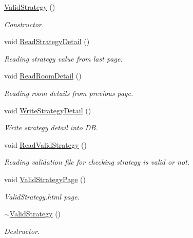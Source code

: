\begin{DoxyCompactItemize}
\item 
\hyperlink{classValidStrategy_ae168db88ebfa1eabdd7f241a631ffc27}{\-Valid\-Strategy} ()
\begin{DoxyCompactList}\small\item\em \-Constructor. \end{DoxyCompactList}\item 
void \hyperlink{classValidStrategy_ae8b17f98d81f8f70d974139086495dfa}{\-Read\-Strategy\-Detail} ()
\begin{DoxyCompactList}\small\item\em \-Reading strategy value from last page. \end{DoxyCompactList}\item 
void \hyperlink{classValidStrategy_acf1a8763ec29b441c822a9ab8c80dc4b}{\-Read\-Room\-Detail} ()
\begin{DoxyCompactList}\small\item\em \-Reading room details from previous page. \end{DoxyCompactList}\item 
void \hyperlink{classValidStrategy_a093620e19cef0865e6e38a26bb41b8bd}{\-Write\-Strategy\-Detail} ()
\begin{DoxyCompactList}\small\item\em \-Write strategy detail into \-D\-B. \end{DoxyCompactList}\item 
void \hyperlink{classValidStrategy_a234ca3ab5aa4684306148afa47b6860b}{\-Read\-Valid\-Strategy} ()
\begin{DoxyCompactList}\small\item\em \-Reading validation file for checking strategy is valid or not. \end{DoxyCompactList}\item 
void \hyperlink{classValidStrategy_ad89451a935f815b4c85b595135d70d94}{\-Valid\-Strategy\-Page} ()
\begin{DoxyCompactList}\small\item\em \-Valid\-Strategy.\-html page. \end{DoxyCompactList}\item 
\hyperlink{classValidStrategy_aec9e6ff1c9e9058a17f5488fe3e6cfec}{$\sim$\-Valid\-Strategy} ()
\begin{DoxyCompactList}\small\item\em \-Destructor. \end{DoxyCompactList}\end{DoxyCompactItemize}
